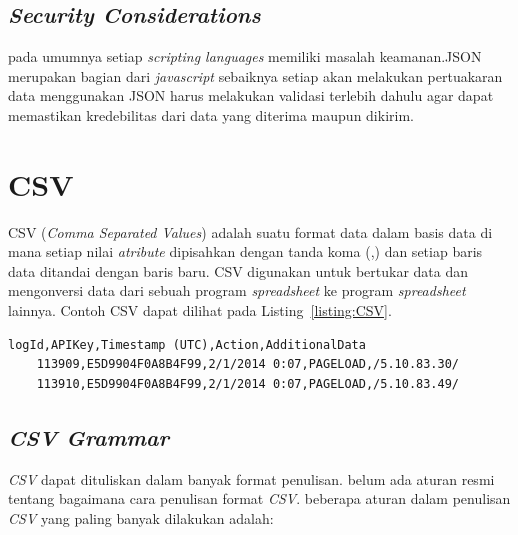\subsection{\textit{Security Considerations}}
pada umumnya setiap \textit{scripting languages} memiliki masalah keamanan.JSON merupakan bagian dari \textit{javascript} sebaiknya setiap akan melakukan pertuakaran data menggunakan JSON harus melakukan validasi terlebih dahulu agar dapat memastikan kredebilitas dari data yang diterima maupun dikirim.

\section{CSV}
\label{subsec:csv}
CSV (\textit{Comma Separated Values}) adalah suatu format data dalam basis data di mana setiap nilai \textit{atribute} dipisahkan dengan tanda koma (,) dan setiap baris data ditandai dengan baris baru.\cite{RFC:4180} CSV digunakan untuk bertukar data dan mengonversi data dari sebuah program \textit{spreadsheet} ke program \textit{spreadsheet} lainnya. Contoh CSV dapat dilihat pada Listing~\ref{listing:CSV}.

\begin{lstlisting}[caption=Contoh CSV, label=listing:CSV]
    logId,APIKey,Timestamp (UTC),Action,AdditionalData
    113909,E5D9904F0A8B4F99,2/1/2014 0:07,PAGELOAD,/5.10.83.30/
    113910,E5D9904F0A8B4F99,2/1/2014 0:07,PAGELOAD,/5.10.83.49/
\end{lstlisting}


\subsection{\textit{ CSV Grammar}}
\textit{CSV} dapat dituliskan dalam banyak format penulisan. belum ada aturan resmi tentang bagaimana cara penulisan format \textit{CSV}. beberapa aturan dalam penulisan \textit{CSV} yang paling banyak dilakukan adalah:

